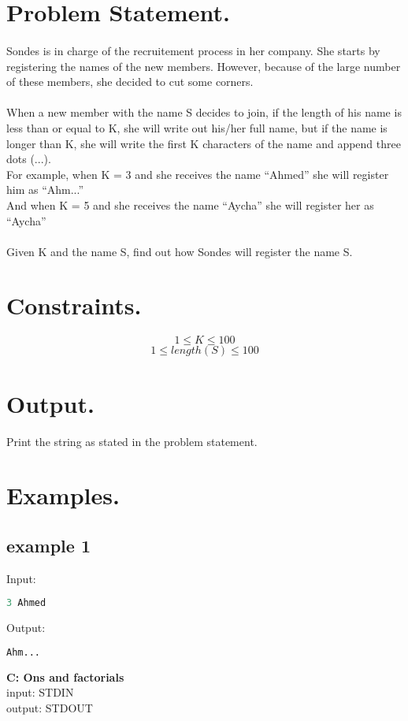 \documentclass[10pt]{article}
\begin{document}
\section{Problem Statement.}
\paragraph{}
Sondes is in charge of the recruitement process in her company. She starts by registering the names of the new members.
However, because of the large number of these members, she decided to cut some corners.
\paragraph{}
When a new member with the name S decides to join, if the length of his name is less than or equal to K, she will write out his/her full name, but if the name is longer than K, she will write the first K characters of the name and append three dots (...).\\
For example, when K = 3 and she receives the name “Ahmed” she will register him as “Ahm...”\\
And when K = 5 and she receives the name “Aycha” she will register her as “Aycha”\\
\paragraph{}
Given K and the name S, find out how Sondes will register the name S.
\paragraph{}
\section{Constraints.}
$$ 1\le K \le 100 $$
$$ 1\le length(S) \le 100 $$
\section{Output.}
Print the string as stated in the problem statement.
\section{Examples.}
\subsection{example 1}
Input:
\begin{lstlisting}[language=Python]
3 Ahmed
\end{lstlisting}
Output:
\begin{lstlisting}[language=Python]
Ahm...
\end{lstlisting}
\newpage
\begin{center}
    \Huge { \textbf{C: Ons and factorials}}\\
    \normalsize  { input:  STDIN}\\
    \normalsize{    output: STDOUT}
\end{center}
\end{document}
